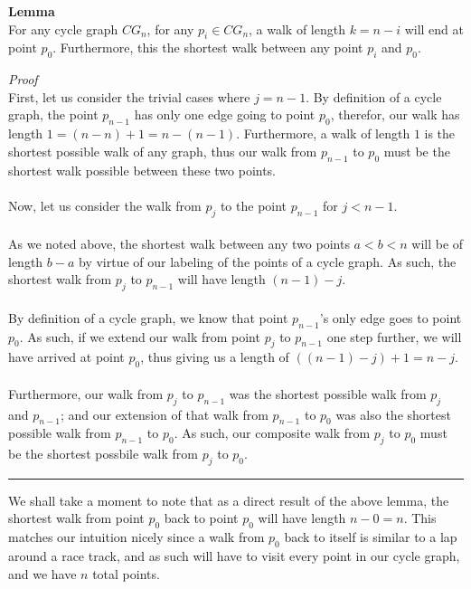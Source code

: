 \documentclass[a4paper,12pt]{article}
\begin{document}
\begin{tcolorbox}
\textbf{Lemma}\\
For any cycle graph $CG_n$, for any $p_i \in CG_n$, a walk of length $k = n - i$ will end at point $p_0$. Furthermore, this the shortest walk between any point $p_i$ and $p_0$.\\
\end{tcolorbox}
\noindent
\textit{Proof}\\
First, let us consider the trivial cases where $j = n - 1$. By definition of a cycle graph, the point $p_{n-1}$ has only one edge going to point $p_0$, therefor, our walk has length $1 = (n - n) + 1 = n - (n - 1)$. Furthermore, a walk of length $1$ is the shortest possible walk of any graph, thus our walk from $p_{n-1}$ to $p_0$ must be the shortest walk possible between these two points.\\
\\ 
Now, let us consider the walk from $p_j$ to the point $p_{n-1}$ for $j < n - 1$.\\
\\
As we noted above, the shortest walk between any two points $a < b < n$ will be of length $b - a$ by virtue of our labeling of the points of a cycle graph. As such, the shortest walk from $p_j$ to $p_{n-1}$ will have length $(n - 1) - j$.\\
\\
By definition of a cycle graph, we know that point $p_{n-1}$'s only edge goes to point $p_0$. As such, if we extend our walk from point $p_j$ to $p_{n-1}$ one step further, we will have arrived at point $p_0$, thus giving us a length of $((n - 1) - j) + 1 = n - j$.\\
\\
Furthermore, our walk from $p_j$ to $p_{n-1}$ was the shortest possible walk from $p_j$ and $p_{n-1}$; and our extension of that walk from $p_{n-1}$ to $p_0$ was also the shortest possible walk from $p_{n-1}$ to $p_0$. As such, our composite walk from $p_j$ to $p_0$ must be the shortest possbile walk from $p_j$ to $p_0$.
\begin{center}
\noindent\rule{8cm}{0.4pt}
\end{center} 
\noindent
We shall take a moment to note that as a direct result of the above lemma, the shortest walk from point $p_0$ back to point $p_0$ will have length $n - 0 = n$. This matches our intuition nicely since a walk from $p_0$ back to itself is similar to a lap around a race track, and as such will have to visit every point in our cycle graph, and we have $n$ total points.\\
\end{document}
